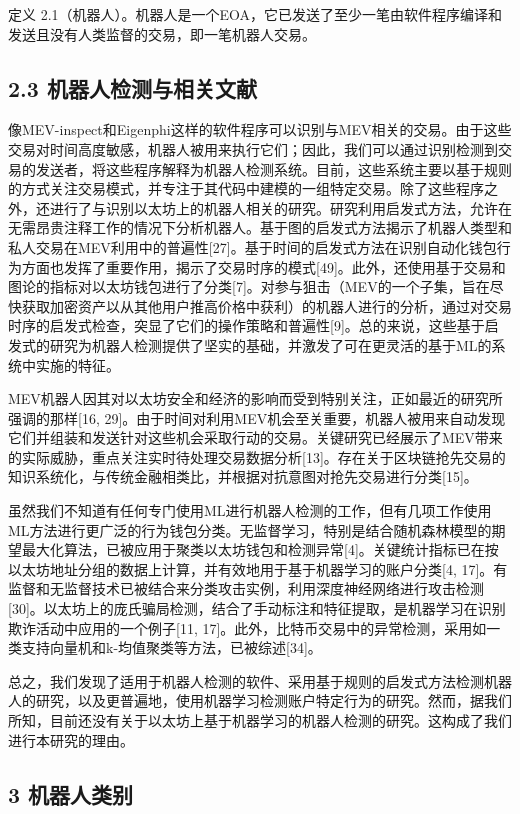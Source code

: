定义 2.1（机器人）。机器人是一个EOA，它已发送了至少一笔由软件程序编译和发送且没有人类监督的交易，即一笔机器人交易。

\subsection*{2.3 机器人检测与相关文献}

像MEV-inspect和Eigenphi这样的软件程序可以识别与MEV相关的交易。由于这些交易对时间高度敏感，机器人被用来执行它们；因此，我们可以通过识别检测到交易的发送者，将这些程序解释为机器人检测系统。目前，这些系统主要以基于规则的方式关注交易模式，并专注于其代码中建模的一组特定交易。除了这些程序之外，还进行了与识别以太坊上的机器人相关的研究。研究利用启发式方法，允许在无需昂贵注释工作的情况下分析机器人。基于图的启发式方法揭示了机器人类型和私人交易在MEV利用中的普遍性[27]。基于时间的启发式方法在识别自动化钱包行为方面也发挥了重要作用，揭示了交易时序的模式[49]。此外，还使用基于交易和图论的指标对以太坊钱包进行了分类[7]。对参与狙击（MEV的一个子集，旨在尽快获取加密资产以从其他用户推高价格中获利）的机器人进行的分析，通过对交易时序的启发式检查，突显了它们的操作策略和普遍性[9]。总的来说，这些基于启发式的研究为机器人检测提供了坚实的基础，并激发了可在更灵活的基于ML的系统中实施的特征。

MEV机器人因其对以太坊安全和经济的影响而受到特别关注，正如最近的研究所强调的那样[16, 29]。由于时间对利用MEV机会至关重要，机器人被用来自动发现它们并组装和发送针对这些机会采取行动的交易。关键研究已经展示了MEV带来的实际威胁，重点关注实时待处理交易数据分析[13]。存在关于区块链抢先交易的知识系统化，与传统金融相类比，并根据对抗意图对抢先交易进行分类[15]。

虽然我们不知道有任何专门使用ML进行机器人检测的工作，但有几项工作使用ML方法进行更广泛的行为钱包分类。无监督学习，特别是结合随机森林模型的期望最大化算法，已被应用于聚类以太坊钱包和检测异常[4]。关键统计指标已在按以太坊地址分组的数据上计算，并有效地用于基于机器学习的账户分类[4, 17]。有监督和无监督技术已被结合来分类攻击实例，利用深度神经网络进行攻击检测[30]。以太坊上的庞氏骗局检测，结合了手动标注和特征提取，是机器学习在识别欺诈活动中应用的一个例子[11, 17]。此外，比特币交易中的异常检测，采用如一类支持向量机和k-均值聚类等方法，已被综述[34]。

总之，我们发现了适用于机器人检测的软件、采用基于规则的启发式方法检测机器人的研究，以及更普遍地，使用机器学习检测账户特定行为的研究。然而，据我们所知，目前还没有关于以太坊上基于机器学习的机器人检测的研究。这构成了我们进行本研究的理由。

\subsection*{3 机器人类别}

